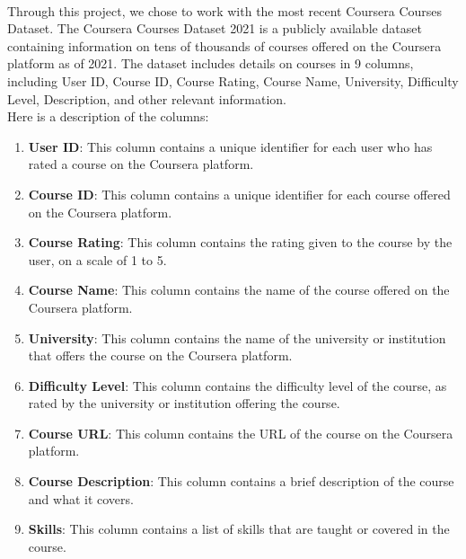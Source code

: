 \documentclass{cup-pan}
\begin{document}
\paragraph{}
Through this project, we chose to work with the most recent Coursera Courses Dataset.
The Coursera Courses Dataset 2021 is a publicly available dataset containing information on tens of thousands of courses offered on the Coursera platform as of 2021. The dataset includes details on courses in 9 columns, including User ID, Course ID, Course Rating, Course Name, University, Difficulty Level, Description, and other relevant information.
\\
Here is a description of the columns:
\begin{enumerate}
  \item \textbf{User ID}: This column contains a unique identifier for each user who has rated a course on the Coursera platform.
  \vspace{0.3cm}
  \item \textbf{Course ID}: This column contains a unique identifier for each course offered on the Coursera platform.
  \vspace{0.3cm}
  \item \textbf{Course Rating}: This column contains the rating given to the course by the user, on a scale of 1 to 5.
  \vspace{0.3cm}
  \item \textbf{Course Name}: This column contains the name of the course offered on the Coursera platform.
  \vspace{0.3cm}
  \item \textbf{University}: This column contains the name of the university or institution that offers the course on the Coursera platform.
  \vspace{0.3cm}
  \item \textbf{Difficulty Level}: This column contains the difficulty level of the course, as rated by the university or institution offering the course.
  \vspace{0.3cm}
  \item \textbf{Course URL}: This column contains the URL of the course on the Coursera platform.
  \vspace{0.3cm}
  \item \textbf{Course Description}: This column contains a brief description of the course and what it covers.
  \vspace{0.3cm}
  \item \textbf{Skills}: This column contains a list of skills that are taught or covered in the course.
\end{enumerate}
\end{document}
